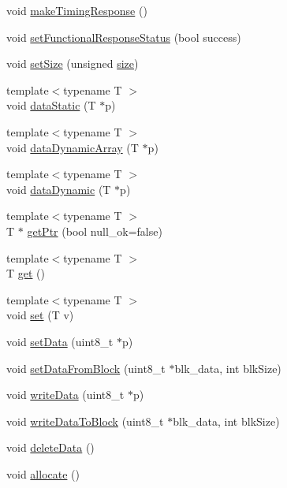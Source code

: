 \begin{DoxyCompactItemize}
\item 
void \hyperlink{classPacket_a325088bded521f69342b08a548811332}{makeTimingResponse} ()
\item 
void \hyperlink{classPacket_a61715904f754e7788941e838fca1dcb9}{setFunctionalResponseStatus} (bool success)
\item 
void \hyperlink{classPacket_a9ad6fec061170a98f1358fc86738e7b3}{setSize} (unsigned \hyperlink{classPacket_a245260f6f74972558f61b85227df5aae}{size})
\item 
{\footnotesize template$<$typename T $>$ }\\void \hyperlink{classPacket_a60621b00d6ecd49b3e336087aca2eda0}{dataStatic} (T $\ast$p)
\item 
{\footnotesize template$<$typename T $>$ }\\void \hyperlink{classPacket_ae02c6b2e23b2a5b138c85fcf91fd818d}{dataDynamicArray} (T $\ast$p)
\item 
{\footnotesize template$<$typename T $>$ }\\void \hyperlink{classPacket_a970b12a3c3c7fe790502959ffe561eda}{dataDynamic} (T $\ast$p)
\item 
{\footnotesize template$<$typename T $>$ }\\T $\ast$ \hyperlink{classPacket_a5c451baf3f0a89084e79e69bb9061200}{getPtr} (bool null\_\-ok=false)
\item 
{\footnotesize template$<$typename T $>$ }\\T \hyperlink{classPacket_af6ea056c8af82f08af9fd0d857967f9b}{get} ()
\item 
{\footnotesize template$<$typename T $>$ }\\void \hyperlink{classPacket_a64d947d8dd285398050238bf26c1d8d2}{set} (T v)
\item 
void \hyperlink{classPacket_aaa0b1cd19807fc630d9331be9f5d1d36}{setData} (uint8\_\-t $\ast$p)
\item 
void \hyperlink{classPacket_a0001ad64c160390fba5d1351862195ff}{setDataFromBlock} (uint8\_\-t $\ast$blk\_\-data, int blkSize)
\item 
void \hyperlink{classPacket_a2388a13bab41142d6e403b0e5a0fb649}{writeData} (uint8\_\-t $\ast$p)
\item 
void \hyperlink{classPacket_ac14ab45b04f07f4aca586b773f2252db}{writeDataToBlock} (uint8\_\-t $\ast$blk\_\-data, int blkSize)
\item 
void \hyperlink{classPacket_a01374b232898f3d3c134623ffded84af}{deleteData} ()
\item 
void \hyperlink{classPacket_acaefe811b78a2fdc4a0dba0c4029c3ef}{allocate} ()

\end{DoxyCompactItemize}
